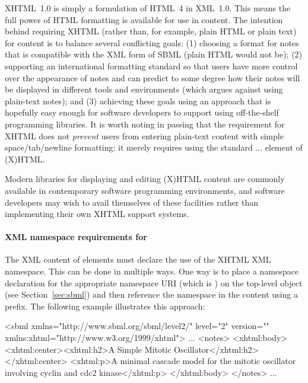 XHTML~1.0 is simply a formulation of HTML~4 in XML~1.0.  This
means the full power of HTML formatting is available for use in
 content.  The intention behind requiring XHTML
(rather than, for example, plain HTML or plain text) for
 content is to balance several conflicting goals: (1)
choosing a format for notes that is compatible with the XML form of
SBML (plain HTML would not be); (2) supporting an international
formatting standard so that users have more control over the
appearance of notes and can predict to some degree how their notes
will be displayed in different tools and environments (which
argues against using plain-text notes); and (3) achieving these
goals using an approach that is hopefully easy enough for software
developers to support using off-the-shelf programming libraries.
It is worth noting in passing that the requirement for XHTML does
not \emph{prevent} users from entering plain-text content with
simple space/tab/newline formatting: it merely requires using the
standard ... element of (X)HTML.

Modern libraries for displaying and editing (X)HTML content are
commonly available in contemporary software programming
environments, and software developers may wish to avail themselves
of these facilities rather than implementing their own XHTML
support systems.


\paragraph{XML namespace requirements for }

The XML content of  elements must declare the use of
the XHTML XML namespace.  This can be done in multiple ways.  One
way is to place a namespace declaration for the appropriate
namespace URI (which is ) on the
top-level \Sbml object (see Section~\ref{sec:sbml}) and then
reference the namespace in the  content using a
prefix.  The following example illustrates this approach:

\begin{example}
<sbml xmlns="http://www.sbml.org/sbml/level2/" level="2" version=""
      xmlns:xhtml="http://www.w3.org/1999/xhtml">
  ...
  <notes>
    <xhtml:body>
      <xhtml:center><xhtml:h2>A Simple Mitotic Oscillator</xhtml:h2></xhtml:center>
      <xhtml:p>A minimal cascade model for the mitotic oscillator
      involving cyclin and cdc2 kinase</xhtml:p>
    </xhtml:body>
  </notes>
  ...
\end{example}

